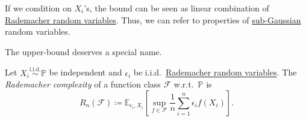 \begin{intuition}
	If we condition on \(X_i\)'s, the bound can be seen as linear combination of \hyperref[eg:Rademacher-random-varaible]{Rademacher random variables}. Thus, we can refer to properties of \hyperref[def:sub-Gaussian]{sub-Gaussian} random variables.
\end{intuition}

The upper-bound deserves a special name.

\begin{definition}\label{def:Rademacher-complexity}
	Let \(X_i \overset{\text{i.i.d.} }{\sim } \mathbb{P} \) be independent and \(\epsilon _i\) be i.i.d.\ \hyperref[eg:Rademacher-random-varaible]{Rademacher random variables}. The \emph{Rademacher complexity} of a function class \(\mathscr{F} \) w.r.t.\ \(\mathbb{P} \) is
	\[
		R_n(\mathscr{F} ) \coloneqq \mathbb{E}_{\epsilon _i, X_i}\left[\sup _{f\in \mathscr{F} } \frac{1}{n}\sum_{i=1}^{n} \epsilon _i f(X_i) \right] .
	\]
\end{definition}


